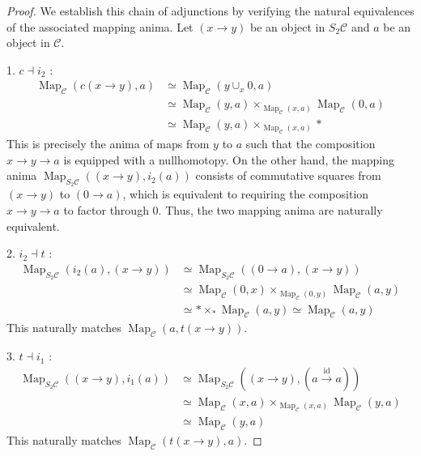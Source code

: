 \documentclass[a4paper,10pt, oneside]{amsart}
\begin{document}
\begin{proof}
	We establish this chain of adjunctions by verifying the natural equivalences of the associated mapping anima. Let $(x \to y)$ be an object in $S_2\mathcal{C}$ and $a$ be an object in $\mathcal{C}$.
	
	1. $c \dashv i_2$ :
	\begin{align*}
		\operatorname{Map}_{\mathcal{C}}(c(x \to y), a) &\simeq \operatorname{Map}_{\mathcal{C}}(y \cup_x 0, a) \\
		&\simeq \operatorname{Map}_{\mathcal{C}}(y, a) \times_{\operatorname{Map}_{\mathcal{C}}(x, a)} \operatorname{Map}_{\mathcal{C}}(0, a) \\
		&\simeq \operatorname{Map}_{\mathcal{C}}(y, a) \times_{\operatorname{Map}_{\mathcal{C}}(x, a)} *
	\end{align*}
	This is precisely the anima of maps from $y$ to $a$ such that the composition $x \to y \to a$ is equipped with a nullhomotopy. On the other hand, the mapping anima $\operatorname{Map}_{S_2\mathcal{C}}((x \to y), i_2(a))$ consists of commutative squares from $(x \to y)$ to $(0 \to a)$, which is equivalent to requiring the composition $x \to y \to a$ to factor through $0$. Thus, the two mapping anima are naturally equivalent.
	
	2. $i_2 \dashv t$ :
	\begin{align*}
		\operatorname{Map}_{S_2\mathcal{C}}(i_2(a), (x \to y)) &\simeq \operatorname{Map}_{S_2\mathcal{C}}((0 \to a), (x \to y)) \\
		&\simeq \operatorname{Map}_{\mathcal{C}}(0, x) \times_{\operatorname{Map}_{\mathcal{C}}(0, y)} \operatorname{Map}_{\mathcal{C}}(a, y) \\
		&\simeq * \times_{*} \operatorname{Map}_{\mathcal{C}}(a, y) \simeq \operatorname{Map}_{\mathcal{C}}(a, y)
	\end{align*}
	This naturally matches $\operatorname{Map}_{\mathcal{C}}(a, t(x \to y))$.
	
3. $t \dashv i_1$ :
	\begin{align*}
		\operatorname{Map}_{S_2\mathcal{C}}((x \to y), i_1(a)) &\simeq \operatorname{Map}_{S_2\mathcal{C}}((x \to y), (a \xrightarrow{\operatorname{id}} a)) \\
		&\simeq \operatorname{Map}_{\mathcal{C}}(x, a) \times_{\operatorname{Map}_{\mathcal{C}}(x, a)} \operatorname{Map}_{\mathcal{C}}(y, a) \\
		&\simeq \operatorname{Map}_{\mathcal{C}}(y, a)
	\end{align*}
	This naturally matches $\operatorname{Map}_{\mathcal{C}}(t(x \to y), a)$.
	

\end{proof}
\end{document}
